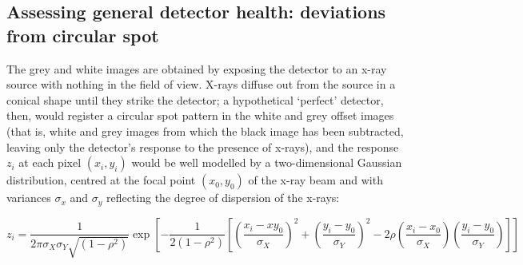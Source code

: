 \documentclass[\main/IO-Pixels.tex]{subfiles}
\begin{document}

\subsection{Assessing general detector health: deviations from circular spot}


The grey and white images are obtained by exposing the detector to an x-ray source with nothing in the field of view. X-rays diffuse out from the source in a conical shape until they strike the detector; a hypothetical `perfect' detector,  then, would register a circular spot pattern in the white and grey offset images (that is, white and grey images from which the black image has been subtracted, leaving only the detector's response to the presence of x-rays), and the response $z_i$ at each pixel $(x_i, y_i)$ would be well modelled by a two-dimensional Gaussian distribution, centred at the focal point $(x_0, y_0)$ of the x-ray beam and with variances $\sigma_x$ and $\sigma_y$ reflecting the degree of dispersion of the x-rays:

\[ z_i = \frac{1}{2\pi \sigma_X \sigma_Y \sqrt{(1-\rho^2)}} \exp \left[ -\frac{1}{2(1-\rho^2)} \left[ \left(\frac{x_i-xy_0}{\sigma_X}\right)^2 + \left(\frac{y_i-y_0}{\sigma_Y}\right)^2 - 2\rho\left(\frac{x_i-x_0}{\sigma_X} \right) \left(\frac{y_i-y_0}{\sigma_Y} \right) \right] \right] \]
\end{document}

